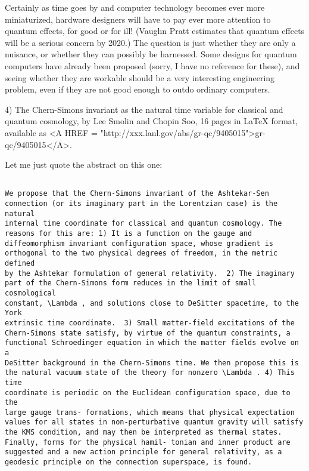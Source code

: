 Certainly as time goes by and computer technology becomes ever more
miniaturized, hardware designers will have to pay ever more attention to
quantum effects, for good or for ill!  (Vaughn Pratt estimates that
quantum effects will be a serious concern by 2020.)  The question is
just whether they are only a nuisance, or whether they can possibly be
harnessed.  Some designs for quantum computers have already been
proposed (sorry, I have no reference for these), and seeing whether they
are workable should be a very interesting engineering problem, even if
they are not good enough to outdo ordinary computers.

4) The Chern-Simons invariant as the natural time variable for classical
and quantum cosmology, by Lee Smolin and Chopin Soo, 16 pages in LaTeX
format, available as <A HREF = "http://xxx.lanl.gov/abs/gr-qc/9405015">gr-qc/9405015</A>.
 
Let me just quote the abstract on this one:


\begin{verbatim}

We propose that the Chern-Simons invariant of the Ashtekar-Sen
connection (or its imaginary part in the Lorentzian case) is the natural
internal time coordinate for classical and quantum cosmology. The
reasons for this are: 1) It is a function on the gauge and
diffeomorphism invariant configuration space, whose gradient is
orthogonal to the two physical degrees of freedom, in the metric defined
by the Ashtekar formulation of general relativity.  2) The imaginary
part of the Chern-Simons form reduces in the limit of small cosmological
constant, \Lambda , and solutions close to DeSitter spacetime, to the York
extrinsic time coordinate.  3) Small matter-field excitations of the
Chern-Simons state satisfy, by virtue of the quantum constraints, a
functional Schroedinger equation in which the matter fields evolve on a
DeSitter background in the Chern-Simons time. We then propose this is
the natural vacuum state of the theory for nonzero \Lambda . 4) This time
coordinate is periodic on the Euclidean configuration space, due to the
large gauge trans- formations, which means that physical expectation
values for all states in non-perturbative quantum gravity will satisfy
the KMS condition, and may then be interpreted as thermal states.
Finally, forms for the physical hamil- tonian and inner product are
suggested and a new action principle for general relativity, as a
geodesic principle on the connection superspace, is found.
\end{verbatim}
    

